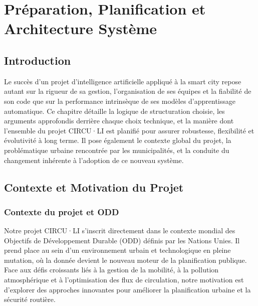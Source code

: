 \chapter{Préparation, Planification et Architecture Système}

\section{Introduction}
Le succès d'un projet d'intelligence artificielle appliqué à la smart city repose autant sur la rigueur de sa gestion, l'organisation de ses équipes et la fiabilité de son code que sur la performance intrinsèque de ses modèles d'apprentissage automatique. Ce chapitre détaille la logique de structuration choisie, les arguments approfondis derrière chaque choix technique, et la manière dont l'ensemble du projet CIRCU·LI est planifié pour assurer robustesse, flexibilité et évolutivité à long terme. Il pose également le contexte global du projet, la problématique urbaine rencontrée par les municipalités, et la conduite du changement inhérente à l'adoption de ce nouveau système.

\section{Contexte et Motivation du Projet}

\subsection{Contexte du projet et ODD}
Notre projet CIRCU·LI s’inscrit directement dans le contexte mondial des Objectifs de Développement Durable (ODD) définis par les Nations Unies. Il prend place au sein d’un environnement urbain et technologique en pleine mutation, où la donnée devient le nouveau moteur de la planification publique. Face aux défis croissants liés à la gestion de la mobilité, à la pollution atmosphérique et à l’optimisation des flux de circulation, notre motivation est d’explorer des approches innovantes pour améliorer la planification urbaine et la sécurité routière.

